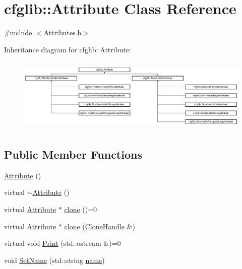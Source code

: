 \hypertarget{classcfglib_1_1Attribute}{}\section{cfglib\+:\+:Attribute Class Reference}
\label{classcfglib_1_1Attribute}


{\ttfamily \#include $<$Attributes.\+h$>$}

Inheritance diagram for cfglib\+:\+:Attribute\+:\begin{figure}[H]
\begin{center}
\leavevmode
\includegraphics[height=3.589744cm]{classcfglib_1_1Attribute}
\end{center}
\end{figure}
\subsection*{Public Member Functions}
\begin{DoxyCompactItemize}
\item 
\hyperlink{classcfglib_1_1Attribute_ac6c6631f3f1a7077a7f3cdd654f4d194}{Attribute} ()
\item 
virtual \hyperlink{classcfglib_1_1Attribute_af8f971cd97eda6e23c35f1afae0a8c66}{$\sim$\+Attribute} ()
\item 
virtual \hyperlink{classcfglib_1_1Attribute}{Attribute} $\ast$ \hyperlink{classcfglib_1_1Attribute_a107366042fdafe881215426059fec3f8}{clone} ()=0
\item 
virtual \hyperlink{classcfglib_1_1Attribute}{Attribute} $\ast$ \hyperlink{classcfglib_1_1Attribute_a73490b82f9b31d8f30b813a2a9d3fe99}{clone} (\hyperlink{classcfglib_1_1CloneHandle}{Clone\+Handle} \&)
\item 
virtual void \hyperlink{classcfglib_1_1Attribute_af8d87ceddde146b92727e61823e0129b}{Print} (std\+::ostream \&)=0
\item 
void \hyperlink{classcfglib_1_1Attribute_ae6e91c4069d2d54d264e25511e81d962}{Set\+Name} (std\+::string \hyperlink{classcfglib_1_1Attribute_a9abcd440f01bbbc57fc64f274033cd22}{name})
\end{DoxyCompactItemize}
